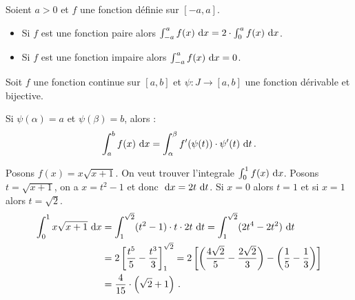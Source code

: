       
      \begin{prop}
            Soient $a>0$ et $f$ une fonction d\'efinie sur $[-a,a]$.
            \begin{itemize}
                  \item Si $f$ est une fonction paire alors $\int_{-a}^{a} f(x) ~\mathrm{d}x = 2 \cdot \int_{0}^{a} f(x) ~\mathrm{d}x$.
                  \item Si $f$ est une fonction impaire alors $\int_{-a}^{a} f(x) ~\mathrm{d}x = 0$.
            \end{itemize}
      \end{prop}
      \begin{thm}
      Soit $f$ une fonction continue sur $[a,b]$ et $\psi : J \rightarrow [a,b]$ une fonction d\'erivable et bijective.
      
      Si $\psi (\alpha) = a$ et $\psi (\beta) = b$, alors : 
            \begin{equation*}
                  \int_{a}^{b} f(x) ~\mathrm{d}x = \int_{\alpha}^{\beta} f'(\psi(t)) \cdot \psi'(t) ~\mathrm{d}t      \,.
            \label{eq:changement de variable integrale}
            \end{equation*}
            \begin{ex}
                  Posons $f(x) = x \sqrt{x+1}$.
                  On veut trouver l'integrale $\int_{0}^{1} f(x) ~\mathrm{d}x$.
                  Posons $t = \sqrt{x+1}$, on a $x = t^2 - 1$ et donc $~\mathrm{d}x = 2t ~\mathrm{d}t$.
                  Si $x=0$ alors $t=1$ et si $x=1$ alors $t=\sqrt{2}$.
                  \begin{align*}
                  \int_{0}^{1} x \sqrt{x+1} ~\mathrm{d}x & = \int_{1}^{\sqrt{2}} (t^2 - 1) \cdot t \cdot 2t ~\mathrm{d}t                      
                                                  = \int_{1}^{\sqrt{2}} (2t^4 - 2t^2) ~\mathrm{d}t                                   \\
                                                & = 2 \left[ \frac{t^5}{5} - \frac{t^3}{3} \right]_{1}^{\sqrt{2}}           
                                                  = 2 \left[ 
                                                      \left( \frac{4\sqrt{2}}{5}-\frac{2\sqrt{2}}{3} \right) 
                                                      -
                                                      \left( \frac{1}{5} - \frac{1}{3} \right)
                                                      \right]                                                               \\
                                                & = \frac{4}{15} \cdot \left(\sqrt{2} + 1 \right)                           \,.
                  \end{align*}
            \end{ex}
      \end{thm}
